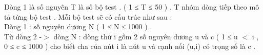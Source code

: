 Dòng 1 là số nguyên T là số bộ test . (  1 ≤ T ≤ 50 ) . T nhóm dòng tiếp theo mô tả từng bộ test . Mỗi bộ test sẽ có cấu trúc như sau :   
\\   Dòng 1 : số nguyên dương N ( 1 ≤ N ≤ 1000 ) .   
\\   Từ dòng 2 -$>$ dòng N : dòng thứ i gồm 2 số nguyên dương u và c ( 1 ≤ u $<$ i , 0 ≤ c ≤ 1000 ) cho biết cha của nút i là nút u và cạnh nối (u,i) có trọng số là c .  

\